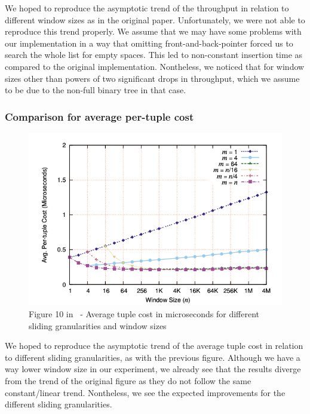 We hoped to reproduce the asymptotic trend of the throughput in relation to different window sizes as in the original paper. Unfortunately, we were not able to reproduce this trend properly. We assume that we may have some problems with our implementation in a way that omitting front-and-back-pointer forced us to search the whole list for empty spaces. This led to non-constant insertion time as compared to the original implementation. Nontheless, we noticed that for window sizes other than powers of two significant drops in throughput, which we assume to be due to the non-full binary tree in that case.

\subsubsection{Comparison for average per-tuple cost}



\begin{figure}[H]
	\centering
	\includegraphics[width=\linewidth]{../figures/fig10}
	\caption{Figure 10 in~\cite{GeneralIncremental15} -  Average tuple cost in microseconds for different sliding granularities and window sizes}
	\label{fig:original_architecture}
\end{figure}

We hoped to reproduce the asymptotic trend of the average tuple cost in relation to different sliding granularities, as with the previous figure. Although we have a way lower window size in our experiment, we already see that the results diverge from the trend of the original figure as they do not follow the same constant/linear trend. Nontheless, we see the expected improvements for the different sliding granularities.

